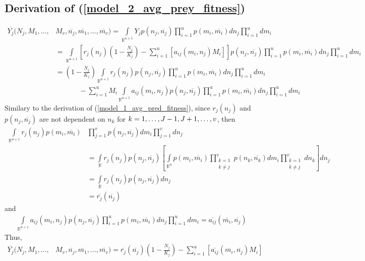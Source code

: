 \documentclass{amsart}
\theoremstyle{definition}
\theoremstyle{remark}
\numberwithin{equation}{section}
\begin{document}
\subsection*{Derivation of (\ref{model_2_avg_prey_fitness})}
\begin{align*}
	\overline{Y_j}(N_j, M_1, \dots, &M_v, \overline{n_j}, \overline{m_1}, \dots, \overline{m_v}) = \int\limits_{\mathbb{R}^{u+1}}^{}Y_jp(n_j, \overline{n_j})\prod\limits_{i = 1}^{u}p(m_i, \overline{m_i})dn_j\prod\limits_{i = 1}^{u}dm_i \\
	&= \int\limits_{\mathbb{R}^{u+1}}\left[r_j(n_j)\left(1 - \frac{N_j}{K_j}\right) - \sum\limits_{i = 1}^{u}\left[a_{ij}(m_i, n_j)M_i\right]\right]p(n_j, \overline{n_j})\prod\limits_{i = 1}^{u}p(m_i, \overline{m_i})dn_j\prod\limits_{i = 1}^{u}dm_i \\
	&= \left(1 - \frac{N_j}{K_j}\right)\int\limits_{\mathbb{R}^{u+1}}r_j(n_j)p(n_j, \overline{n_j})\prod\limits_{i = 1}^{u}p(m_i, \overline{m_i})dn_j\prod\limits_{i = 1}^{u}dm_i \\
	&\ \ \ \ \ \ \ \ \ \ \ \ \ \ \ - \sum\limits_{i=1}^{u}M_i\int\limits_{\mathbb{R}^{u+1}}a_{ij}(m_i, n_j)p(n_j, \overline{n_j})\prod\limits_{i = 1}^{u}p(m_i, \overline{m_i})dn_j\prod\limits_{i = 1}^{u}dm_i
\end{align*}
Similary to the derivation of (\ref{model_1_avg_pred_fitness}), since $r_j(n_j)$ and $p(n_j, \overline{n_j})$ are not dependent on $n_k$ for $k = 1, \dots, J-1, J+1, \dots, v$, then 
\begin{align*}
	\int\limits_{\mathbb{R}^{u+1}}^{}r_j(n_j)p(m_i, \overline{m_i})&\prod\limits_{j = 1}^{v}p(n_j, \overline{n_j})dm_i\prod\limits_{j = 1}^{v}dn_j \\
	&= \int\limits_{\mathbb{R}}r_j(n_j)p(n_j, \overline{n_j})\left[\int\limits_{\mathbb{R}^{u}}p(m_i, \overline{m_i})\prod\limits_{\substack{k=1\\k\neq j}}^{v}p(n_k, \overline{n_k})dm_i\prod\limits_{\substack{k=1\\k\neq j}}^{v}dn_k\right]dn_j \\
	&= \int\limits_{\mathbb{R}}r_j(n_j)p(n_j, \overline{n_j})dn_j \\
	&= \overline{r_j}(\overline{n_j})
\end{align*}
and
\begin{align*}
	\int\limits_{\mathbb{R}^{u+1}}a_{ij}(m_i, n_j)p(n_j, \overline{n_j})\prod\limits_{i = 1}^{u}p(m_i, \overline{m_i})dn_j\prod\limits_{i = 1}^{u}dm_i = \overline{a_{ij}}(\overline{m_i}, \overline{n_j})
\end{align*}
Thus,
\begin{align*}
	\overline{Y_j}(N_j, M_1, \dots, &M_v, \overline{n_j}, \overline{m_1}, \dots, \overline{m_v}) = \overline{r_j}(\overline{n_j})\left(1 - \frac{N_j}{K_j}\right) - \sum\limits_{i = 1}^{u}\left[\overline{a_{ij}}(\overline{m_i}, \overline{n_j})M_i\right]
\end{align*}
\end{document}
